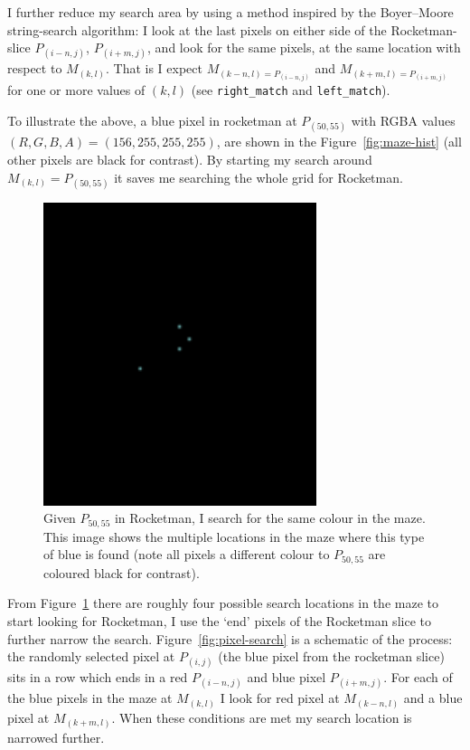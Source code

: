 \documentclass[prb,11pt,twocolumn]{revtex4-1}
\begin{document}
I further reduce my search area by using a method inspired by the Boyer–Moore string-search algorithm: I look at the last pixels on either side of the Rocketman-slice $P_{(i-n,j)}$, $P_{(i+m,j)}$, and look for the same pixels, at the same location with respect to $M_{(k,l)}$. That is I expect $M_{(k-n,l)=P_{(i-n,j)}}$ and $M_{(k+m,l)=P_{(i+m,j)}}$ for one or more values of $(k,l)$ (see \texttt{right\_match} and \texttt{left\_match}).

To illustrate the above, a blue pixel in rocketman at $P_{(50,55)}$ with RGBA values $(R,G,B,A)=(156,255,255,255)$, are shown in the Figure~\ref{fig:maze-hist} (all other pixels are black for contrast). By starting my search around $M_{(k,l)}=P_{(50,55)}$ it saves me searching the whole grid for Rocketman.

\begin{figure}
     \includegraphics[width=8cm]{blue_pixels_in_maze.pdf}
     \caption{Given $P_{50,55}$ in Rocketman, I search for the same colour in the maze. This image shows the multiple locations in the maze where this type of blue is found (note all pixels a different colour to $P_{50,55}$ are coloured black for contrast).}
     \label{fig:maze-blue}
\end{figure}

From Figure~\ref{fig:maze-blue} there are roughly four possible search locations in the maze to start looking for Rocketman, I use the `end' pixels of the Rocketman slice to further narrow the search. Figure~\ref{fig:pixel-search} is a schematic of the process: the randomly selected pixel at $P_{(i,j)}$  (the blue pixel from the rocketman slice) sits in a row which ends in a red $P_{(i-n,j)}$ and blue pixel $P_{(i+m,j)}$. For each of the blue pixels in the maze at $M_{(k,l)}$ I look for red pixel at $M_{(k-n,l)}$ and a blue pixel at $M_{(k+m,l)}$. When these conditions are met my search location is narrowed further.
\end{document}
